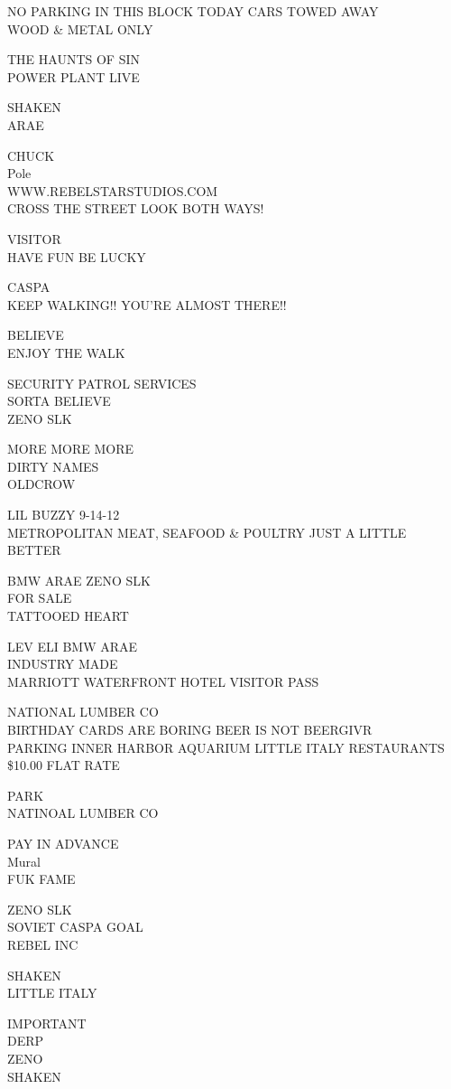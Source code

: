 \documentclass[10pt,letterpaper]{article}
\begin{document}
NO PARKING IN THIS BLOCK TODAY CARS TOWED AWAY\\
WOOD \& METAL ONLY

THE HAUNTS OF SIN\\
POWER PLANT LIVE

SHAKEN\\
ARAE

CHUCK\\
Pole\\
WWW.REBELSTARSTUDIOS.COM\\
CROSS THE STREET LOOK BOTH WAYS!

VISITOR\\
HAVE FUN BE LUCKY

CASPA\\
KEEP WALKING!! YOU'RE ALMOST THERE!!

BELIEVE\\
ENJOY THE WALK

SECURITY PATROL SERVICES\\
SORTA BELIEVE\\
ZENO SLK

MORE MORE MORE\\
DIRTY NAMES\\
OLDCROW

LIL BUZZY 9{-}14{-}12\\
METROPOLITAN MEAT, SEAFOOD \& POULTRY JUST A LITTLE BETTER

BMW ARAE ZENO SLK\\
FOR SALE\\
TATTOOED HEART

LEV ELI BMW ARAE\\
INDUSTRY MADE\\
MARRIOTT WATERFRONT HOTEL VISITOR PASS

NATIONAL LUMBER CO\\
BIRTHDAY CARDS ARE BORING BEER IS NOT BEERGIVR\\
PARKING INNER HARBOR AQUARIUM LITTLE ITALY RESTAURANTS \$10.00 FLAT RATE

PARK\\
NATINOAL LUMBER CO

PAY IN ADVANCE\\
Mural\\
FUK FAME

ZENO SLK\\
SOVIET CASPA GOAL\\
REBEL INC

SHAKEN\\
LITTLE ITALY

IMPORTANT\\
DERP\\
ZENO\\
SHAKEN
\end{document}
